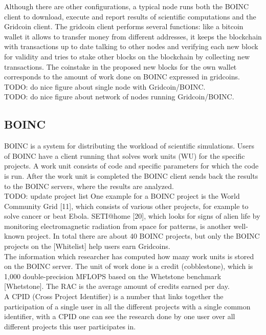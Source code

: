 Although there are other configurations, a typical node runs both the BOINC client to download, execute and report results of scientific computations and the Gridcoin client. The gridcoin client performs several functions: like a bitcoin wallet it allows to transfer money from different addresses, it keeps the blockchain with transactions up to date talking to other nodes and verifying each new block for validity and tries to stake other blocks on the blockchain by collecting new transactions. The coinstake in the proposed new blocks for the own wallet corresponds to the amount of work done on BOINC expressed in gridcoins.\\

TODO: do nice figure about single node with Gridcoin/BOINC.\\
TODO: do nice figure about network of nodes running Gridcoin/BOINC.\\

\subsection{BOINC}

BOINC is a system for distributing the workload of scientific simulations. Users of BOINC have a client running that solves work units (WU) for the specific projects. A work unit consists of code and specific parameters for which the code is run.  After the work unit is completed the BOINC client sends back the results to the BOINC servers, where the results are analyzed.\\

TODO: update project list
One example for a BOINC project is the World Community Grid [11], which consists of various other projects, for example to solve cancer or beat Ebola. SETI@home [20], which looks for signs of alien life by monitoring electromagnetic radiation from space for patterns, is another well-known project.  In total there are about 40 BOINC projects, but only the BOINC projects on the [Whitelist] help users earn Gridcoins.\\

The information which researcher has computed how many work units is stored on the BOINC server. The unit of work done is a credit (cobblestone), which is 1,000 double-precision MFLOPS based on the Whetstone benchmark [Whetstone].  The RAC is the average amount of credits earned  per day.\\

A CPID (Cross Project Identifier) is a number that links together the participation of a single user in all the different projects with a single common identifier, with a CPID one can see the research done by one user over all different projects this user participates in.\\


